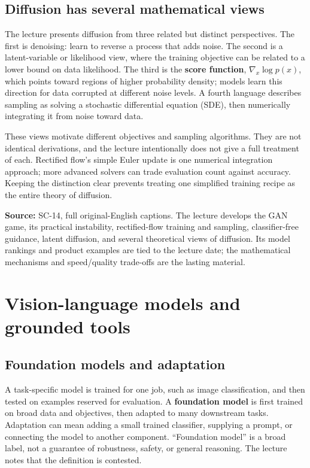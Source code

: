 \subsection{Diffusion has several mathematical views}\label{04-visual-computing-ii-ch031-diffusion-has-several-mathematical-views}

The lecture presents diffusion from three related but distinct perspectives. The first is denoising: learn to reverse a process that adds noise. The second is a latent-variable or likelihood view, where the training objective can be related to a lower bound on data likelihood. The third is the \textbf{score function}, \(\nabla_x\log p(x)\), which points toward regions of higher probability density; models learn this direction for data corrupted at different noise levels. A fourth language describes sampling as solving a stochastic differential equation (SDE), then numerically integrating it from noise toward data.

These views motivate different objectives and sampling algorithms. They are not identical derivations, and the lecture intentionally does not give a full treatment of each. Rectified flow's simple Euler update is one numerical integration approach; more advanced solvers can trade evaluation count against accuracy. Keeping the distinction clear prevents treating one simplified training recipe as the entire theory of diffusion.

\textbf{Source:} SC-14, full original-English captions. The lecture develops the GAN game, its practical instability, rectified-flow training and sampling, classifier-free guidance, latent diffusion, and several theoretical views of diffusion. Its model rankings and product examples are tied to the lecture date; the mathematical mechanisms and speed/quality trade-offs are the lasting material.

\section{Vision-language models and grounded tools}\label{04-visual-computing-ii-ch031-vision-language-models-and-grounded-tools}

\subsection{Foundation models and adaptation}\label{04-visual-computing-ii-ch031-foundation-models-and-adaptation}

A task-specific model is trained for one job, such as image classification, and then tested on examples reserved for evaluation. A \textbf{foundation model} is first trained on broad data and objectives, then adapted to many downstream tasks. Adaptation can mean adding a small trained classifier, supplying a prompt, or connecting the model to another component. ``Foundation model'' is a broad label, not a guarantee of robustness, safety, or general reasoning. The lecture notes that the definition is contested.

